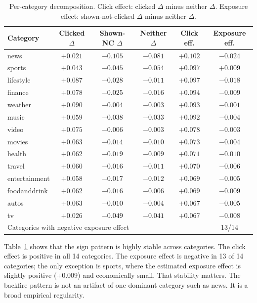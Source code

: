 \documentclass[11pt]{article}
\begin{document}
\begin{table}[ht]
\centering
\caption{Per-category decomposition. Click effect: clicked $\Delta$ minus neither $\Delta$. Exposure effect: shown-not-clicked $\Delta$ minus neither $\Delta$.}
\label{tab:exposure_percat}
\small
\begin{tabular}{lccccc}
\toprule
Category & Clicked $\Delta$ & Shown-NC $\Delta$ & Neither $\Delta$ & Click eff. & Exposure eff. \\
\midrule
news & $+0.021$ & $-0.105$ & $-0.081$ & $+0.102$ & $-0.024$ \\
sports & $+0.043$ & $-0.045$ & $-0.054$ & $+0.097$ & $+0.009$ \\
lifestyle & $+0.087$ & $-0.028$ & $-0.011$ & $+0.097$ & $-0.018$ \\
finance & $+0.078$ & $-0.025$ & $-0.016$ & $+0.094$ & $-0.009$ \\
weather & $+0.090$ & $-0.004$ & $-0.003$ & $+0.093$ & $-0.001$ \\
music & $+0.059$ & $-0.038$ & $-0.033$ & $+0.092$ & $-0.004$ \\
video & $+0.075$ & $-0.006$ & $-0.003$ & $+0.078$ & $-0.003$ \\
movies & $+0.063$ & $-0.014$ & $-0.010$ & $+0.073$ & $-0.004$ \\
health & $+0.062$ & $-0.019$ & $-0.009$ & $+0.071$ & $-0.010$ \\
travel & $+0.060$ & $-0.016$ & $-0.011$ & $+0.070$ & $-0.006$ \\
entertainment & $+0.058$ & $-0.017$ & $-0.012$ & $+0.069$ & $-0.005$ \\
foodanddrink & $+0.062$ & $-0.016$ & $-0.006$ & $+0.069$ & $-0.009$ \\
autos & $+0.063$ & $-0.010$ & $-0.004$ & $+0.067$ & $-0.005$ \\
tv & $+0.026$ & $-0.049$ & $-0.041$ & $+0.067$ & $-0.008$ \\
\midrule
\multicolumn{5}{l}{Categories with negative exposure effect} & 13/14 \\
\bottomrule
\end{tabular}
\end{table}
\FloatBarrier

Table~\ref{tab:exposure_percat} shows that the sign pattern is highly stable across categories. The click effect is positive in all 14 categories. The exposure effect is negative in 13 of 14 categories; the only exception is sports, where the estimated exposure effect is slightly positive (+0.009) and economically small. That stability matters. The backfire pattern is not an artifact of one dominant category such as news. It is a broad empirical regularity.
\end{document}
